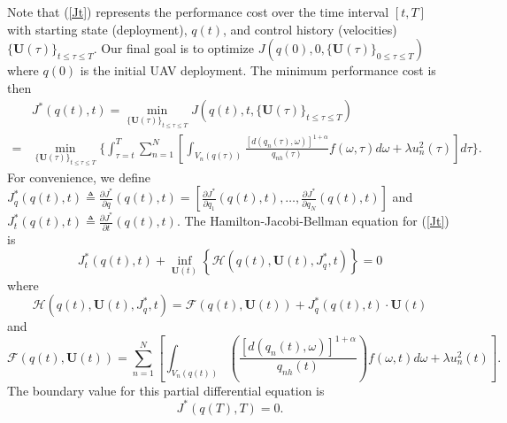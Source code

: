 \documentclass[smallabstract,smallcaptions]{dccpaper}
\newcommand{\bU}{\mathbf{U}}
\newcommand{\bQ}{\ensuremath{q}}          %
\begin{document}
Note that (\ref{Jt}) represents the performance cost over the time interval $[t,T]$ with starting state (deployment), $\bQ(t)$, and control history (velocities) $\{\bU(\tau)\}_{t\le\tau\le T}$.
Our final goal is to optimize $J\!\left(\bQ(0), 0, \{\bU(\tau)\}_{0\le\tau\le T}\right)$ where $\bQ(0)$ is the initial UAV deployment.
The minimum performance cost is then
\begin{equation}
\begin{aligned}
&J^*\left(\bQ(t), t\right) = \min_{\{\bU(\tau)\}_{t\le\tau\le T}}J\!\left(\bQ(t), t, \{\bU(\tau)\}_{t\le\tau\le T}\right)\\
{=}& \min_{\{\bU(\tau)\}_{t\le\tau\le T}}\bigg\{\int_{\tau=t}^{T}\sum_{n=1}^{N}\left[\int_{V_n\left(\bQ(\tau)\right)}\!\!\!\!\frac{\left[d\left(q_n(\tau),\omega\right)\right]^{1+\alpha}}{q_{nh}\left(\tau\right)}f\left(\omega,\tau\right)d\omega + \lambda u^2_n(\tau) \right] d\tau\bigg\}.
\end{aligned}
\end{equation}
For convenience, we define $J^*_{\bQ}\left(\bQ(t), t\right)\triangleq\frac{\partial J^*}{\partial \bQ}\left(\bQ(t), t\right)=\left[\frac{\partial J^*}{\partial q_1}\left(\bQ(t), t\right),\dots,\frac{\partial J^*}{\partial q_N}\left(\bQ(t), t\right)\right]$ and $J^*_{t}\left(\bQ(t), t\right)\triangleq\frac{\partial J^*}{\partial t}\left(\bQ(t), t\right)$.
The Hamilton-Jacobi-Bellman equation \cite{KD,FRC} for (\ref{Jt}) is
\begin{equation}
J^*_t\left(\bQ(t),t\right)+\inf_{\bU(t)}\left\{\mathcal{H}\left(\bQ(t),\bU(t),J^*_{\bQ},t\right)\right\}=0
\label{HIJ}
\end{equation}
where
\begin{equation}
\mathcal{H}\left(\bQ(t),\bU(t),J^*_{\bQ},t\right)=\mathcal{F}\left(\bQ(t),\bU(t)\right)+J^*_{\bQ}\left(\bQ(t),t\right)\cdot \bU\left(t\right)
\label{mH}
\end{equation}
and
%
\begin{equation}
\mathcal{F}\left(\bQ(t),\bU(t)\right)=\sum_{n=1}^{N}\left[\int_{V_n\left(\bQ(t)\right)}\left(\frac{\left[d\left(q_n(t),\omega\right)\right]^{1+\alpha}}{q_{nh}\left(t\right)}\right)f\left(\omega,t\right)d\omega + \lambda u^2_n(t)\right].
\label{mF}
\end{equation}
The boundary value for this partial differential equation is 
\begin{equation}
J^*\left(\bQ(T),T\right)=0.
\end{equation}
\end{document}
